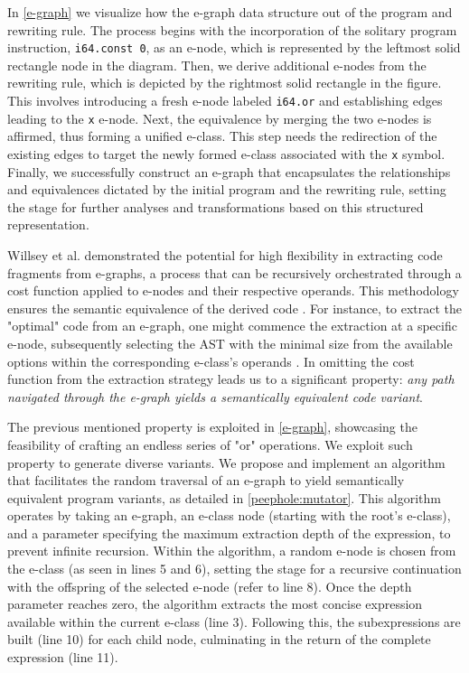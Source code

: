 In \autoref{e-graph} we visualize how the e-graph data structure out of the program and rewriting rule.
The process begins with the incorporation of the solitary program instruction, \texttt{i64.const 0}, as an e-node, which is represented by the leftmost solid rectangle node in the diagram.
Then, we derive additional e-nodes from the rewriting rule, which is depicted by the rightmost solid rectangle in the figure. 
This involves introducing a fresh e-node labeled \texttt{i64.or} and establishing edges leading to the \texttt{x} e-node.
Next, the equivalence by merging the two e-nodes is affirmed, thus forming a unified e-class. 
This step needs the redirection of the existing edges to target the newly formed e-class associated with the \texttt{x} symbol.
Finally, we successfully construct an e-graph that encapsulates the relationships and equivalences dictated by the initial program and the rewriting rule, setting the stage for further analyses and transformations based on this structured representation.

\label{traversal}

Willsey et al. demonstrated the potential for high flexibility in extracting code fragments from e-graphs, a process that can be recursively orchestrated through a cost function applied to e-nodes and their respective operands.
This methodology ensures the semantic equivalence of the derived code \cite{10.1145/3434304}. 
For instance, to extract the "optimal" code from an e-graph, one might commence the extraction at a specific e-node, subsequently selecting the AST with the minimal size from the available options within the corresponding e-class's operands \cite{10.1145/3385412.3386012}.
In \too omitting the cost function from the extraction strategy leads us to a significant property: \emph{any path navigated through the e-graph yields a semantically equivalent code variant}. 

The previous mentioned property is exploited in \autoref{e-graph}, showcasing the feasibility of crafting an endless series of "or" operations. 
We exploit such property to generate diverse \Wasm variants.
We propose and implement an algorithm that facilitates the random traversal of an e-graph to yield semantically equivalent program variants, as detailed in \autoref{peephole:mutator}. 
This algorithm operates by taking an e-graph, an e-class node (starting with the root's e-class), and a parameter specifying the maximum extraction depth of the expression, to prevent infinite recursion.
Within the algorithm, a random e-node is chosen from the e-class (as seen in lines 5 and 6), setting the stage for a recursive continuation with the offspring of the selected e-node (refer to line 8). 
Once the depth parameter reaches zero, the algorithm extracts the most concise expression available within the current e-class (line 3). 
Following this, the subexpressions are built (line 10) for each child node, culminating in the return of the complete expression (line 11).


